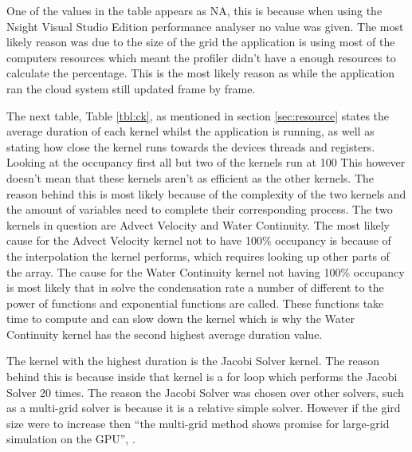 One of the values in the table appears as NA, this is because when using the Nsight Visual Studio Edition performance analyser no value was given.
The most likely reason was due to the size of the grid the application is using most of the computers resources which meant the profiler didn't have a enough resources to calculate the percentage.
This is the most likely reason as while the application ran the cloud system still updated frame by frame.

The next table, Table \ref{tbl:ck}, as mentioned in section \ref{sec:resource} states the average duration of each kernel whilst the application is running, as well as stating how close the kernel runs towards the devices threads and registers.
Looking at the occupancy first all but two of the kernels run at 100%
This however doesn't mean that these kernels aren't as efficient as the other kernels.
The reason behind this is most likely because of the complexity of the two kernels and the amount of variables need to complete their corresponding process. The two kernels in question are Advect Velocity and Water Continuity.
The most likely cause for the Advect Velocity kernel not to have 100\% occupancy is because of the interpolation the kernel performs, which requires looking up other parts of the array.
The cause for the Water Continuity kernel not having 100\% occupancy is most likely that in solve the condensation rate a number of different to the power of functions and exponential functions are called.
These functions take time to compute and can slow down the kernel which is why the Water Continuity kernel has the second highest average duration value. 

The kernel with the highest duration is the Jacobi Solver kernel.
The reason behind this is because inside that kernel is a for loop which performs the Jacobi Solver 20 times.
The reason the Jacobi Solver was chosen over other solvers, such as a multi-grid solver is because it is a relative simple solver.
However if the gird size were to increase then “the multi-grid method shows promise for large-grid simulation on the GPU”, \citep{HarrisEtAl03}.